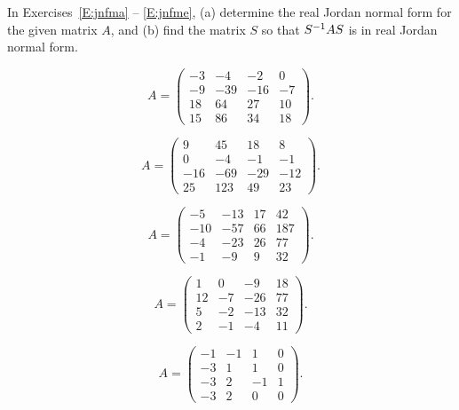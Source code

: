 \noindent In Exercises~\ref{E:jnfma} -- \ref{E:jnfme}, (a) determine the real
Jordan normal form for the given matrix $A$, and (b) find the matrix $S$ so 
that $S^{-1} AS$ is in real Jordan normal form.  
\begin{exercise}  \label{E:jnfma}
\begin{equation*}
A = \left(\begin{array}{rrrr} -3 & -4 & -2 & 0\\
-9 & -39 & -16 & -7\\ 18 & 64 & 27 & 10 \\ 15 & 86 & 34 & 18
\end{array}\right). 
\end{equation*}
\end{exercise}
\begin{exercise}  \label{E:jnfmb}
\begin{equation*}
A =\left(\begin{array}{rrrr} 9 & 45 & 18 & 8\\
0 & -4 & -1 & -1\\ -16 & -69 & -29 & -12 \\ 25 & 123 & 49 & 23
\end{array}\right). 
\end{equation*}
\end{exercise}
\begin{exercise}  \label{E:jnfmc}
\begin{equation*}
A = \left(\begin{array}{rrrr} -5 & -13 & 17 & 42\\
-10 & -57 & 66 & 187\\ -4 & -23 & 26 & 77 \\ -1 & -9 & 9 & 32
\end{array}\right).  
\end{equation*}
\end{exercise}
\begin{exercise}  \label{E:jnfmd}
\begin{equation*}
A = \left(\begin{array}{rrrr} 1 & 0 & -9 & 18 \\
12 & -7 & -26 & 77\\ 5 & -2 & -13 & 32 \\ 2 & -1 & -4 & 11
\end{array}\right). 
\end{equation*}
\end{exercise}
\begin{exercise} \label{E:jnfme}
\begin{equation*}
A = \left(\begin{array}{rrrr} 
    -1  &  -1  &   1   &  0\\
    -3  &   1  &   1   &  0\\
    -3  &   2  &  -1   &  1\\
    -3  &   2  &   0   &  0
 \end{array}\right). 
\end{equation*}
\end{exercise}
